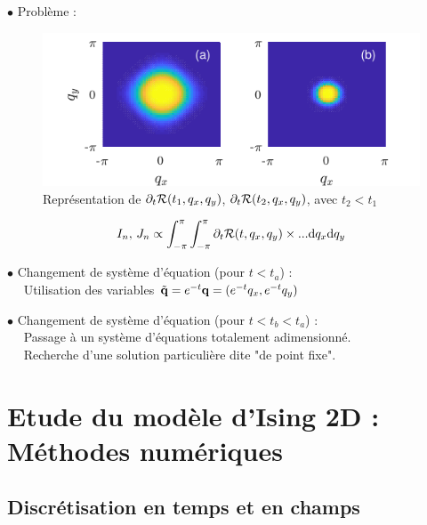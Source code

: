 \documentclass[9pt]{beamer}
\begin{document}
	
	\begin{frame}
	\justifying
	\vspace*{22pt}
	
	$\bullet$ Problème :
	
	\begin{figure}[H]
\begin{center}
\includegraphics[scale = 0.9]{DerRegIsing.pdf}
\caption{Représentation de $\partial_t \mathcal{R}(t_1, q_x, q_y)$, $\partial_t \mathcal{R}(t_2, q_x, q_y)$, avec $t_2 < t_1$}
	\label{fig:schemaIsing}
	\end{center}
\end{figure}
\vspace*{-5pt}
\begin{equation*}
	I_n, \, J_n \propto \int_{-\pi}^{\pi}\int_{-\pi}^{\pi} \partial_t \mathcal{R}(t, q_x, q_y) \times ... \text{d} q_x \text{d} q_y
\end{equation*}

$\bullet$ Changement de système d'équation (pour $t<t_a$) :\\
$\quad$ Utilisation des variables $\tilde{{\bf q}} = e^{-t}{\bf q} = (e^{-t}q_x, e^{-t}q_y)$ \\
\vspace*{8pt}
	
	
	$\bullet$ Changement de système d'équation (pour $t<t_b< t_a$) :\\
$\quad$ Passage à un système d'équations totalement adimensionné. \\
$\quad$ Recherche d'une solution particulière dite "de point fixe".

	
		\end{frame}
	
	\section{Etude du modèle d'Ising 2D : Méthodes numériques}
	\subsection{Discrétisation en temps et en champs}
	
\end{document}
